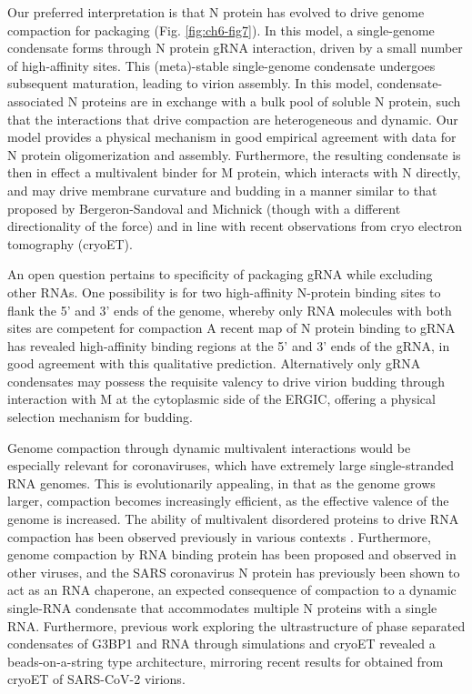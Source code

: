 \documentclass[../main.tex]{subfiles}
\begin{document}
        Our preferred interpretation is that N protein has evolved to drive genome compaction for packaging (Fig. \ref{fig:ch6-fig7}). In this model, a single-genome condensate forms through N protein gRNA interaction, driven by a small number of high-affinity sites. This (meta)-stable single-genome condensate undergoes subsequent maturation, leading to virion assembly. In this model, condensate-associated N proteins are in exchange with a bulk pool of soluble N protein, such that the interactions that drive compaction are heterogeneous and dynamic. Our model provides a physical mechanism in good empirical agreement with data for N protein oligomerization and assembly\cite{Cong2017-hw,Chang2014-fy,Borodavka2013-xr}. Furthermore, the resulting condensate is then in effect a multivalent binder for M protein, which interacts with N directly, and may drive membrane curvature and budding in a manner similar to that proposed by Bergeron-Sandoval and Michnick (though with a different directionality of the force) and in line with recent observations from cryo electron tomography (cryoET)\cite{Klein2020-vw,He2004-xw,Bergeron-Sandoval2018-oo,Bergeron-Sandoval2018-mb}.

        An open question pertains to specificity of packaging gRNA while excluding other RNAs. One possibility is for two high-affinity N-protein binding sites to flank the 5’ and 3’ ends of the genome, whereby only RNA molecules with both sites are competent for compaction A recent map of N protein binding to gRNA has revealed high-affinity binding regions at the 5’ and 3’ ends of the gRNA, in good agreement with this qualitative prediction\cite{Iserman2020-xm}. Alternatively only gRNA condensates may possess the requisite valency to drive virion budding through interaction with M at the cytoplasmic side of the ERGIC, offering a physical selection mechanism for budding.

        Genome compaction through dynamic multivalent interactions would be especially relevant for coronaviruses, which have extremely large single-stranded RNA genomes. This is evolutionarily appealing, in that as the genome grows larger, compaction becomes increasingly efficient, as the effective valence of the genome is increased\cite{Rubinstein2003-fa,Choi2020-nv}. The ability of multivalent disordered proteins to drive RNA compaction has been observed previously in various contexts \cite{Holmstrom2019-ns,Holmstrom2018-yk}. Furthermore, genome compaction by RNA binding protein has been proposed and observed in other viruses\cite{Borodavka2013-xr,Rodriguez2004-dx,Linger2004-lk}, and the SARS coronavirus N protein has previously been shown to act as an RNA chaperone, an expected consequence of compaction to a dynamic single-RNA condensate that accommodates multiple N proteins with a single RNA\cite{Holmstrom2019-ns,Zuniga2007-zc}. Furthermore, previous work exploring the ultrastructure of phase separated condensates of G3BP1 and RNA through simulations and cryoET revealed a beads-on-a-string type architecture, mirroring recent results for obtained from cryoET of SARS-CoV-2 virions\cite{Guillen-Boixet2020-sn,Klein2020-vw}.
\end{document}
